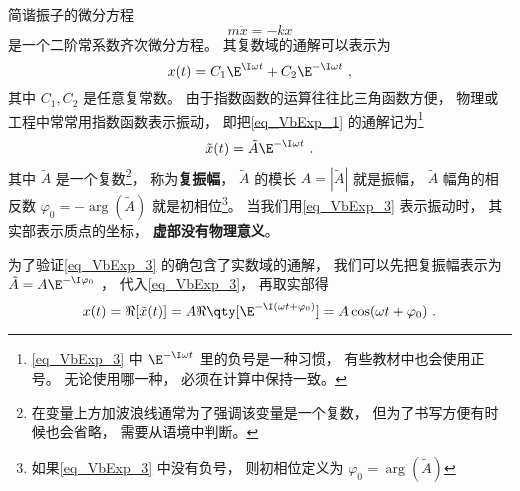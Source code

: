 

简谐振子的微分方程
\begin{equation}\label{eq_VbExp_1}
m\ddot x =  - kx
\end{equation}
是一个二阶常系数齐次微分方程。 其复数域的通解可以表示为
\begin{equation}
x(t) = C_1 \E^{\I \omega t} + C_2 \E^{-\I \omega t}~,
\end{equation}
其中 $C_1, C_2$ 是任意复常数。 由于指数函数的运算往往比三角函数方便， 物理或工程中常常用指数函数表示振动， 即把\autoref{eq_VbExp_1} 的通解记为\footnote{\autoref{eq_VbExp_3} 中 $\E^{-\I \omega t}$ 里的负号是一种习惯， 有些教材中也会使用正号。 无论使用哪一种， 必须在计算中保持一致。}
\begin{equation}\label{eq_VbExp_3}
\tilde x(t) = \tilde A \E^{-\I \omega t}~.
\end{equation}
其中 $\tilde A$ 是一个复数\footnote{在变量上方加波浪线通常为了强调该变量是一个复数， 但为了书写方便有时候也会省略， 需要从语境中判断。}， 称为\textbf{复振幅}， $\tilde A$ 的模长 $A = |\tilde A|$ 就是振幅， $\tilde A$ 幅角的相反数 $\varphi_0 = -\arg(\tilde A)$ 就是初相位\footnote{如果\autoref{eq_VbExp_3} 中没有负号， 则初相位定义为 $\varphi_0 = \arg(\tilde A)$}。 当我们用\autoref{eq_VbExp_3} 表示振动时， 其实部表示质点的坐标， \textbf{虚部没有物理意义}。

为了验证\autoref{eq_VbExp_3} 的确包含了实数域的通解， 我们可以先把复振幅表示为 $\tilde A = A\E^{-\I \varphi_0}$%
， 代入\autoref{eq_VbExp_3}， 再取实部得
\begin{equation}\label{eq_VbExp_2}
x(t) = \Re[\tilde x(t)] = A\Re \qty[\E^{-\I (\omega t + \varphi_0)}] = A \cos(\omega t + \varphi_0)~.
\end{equation}

